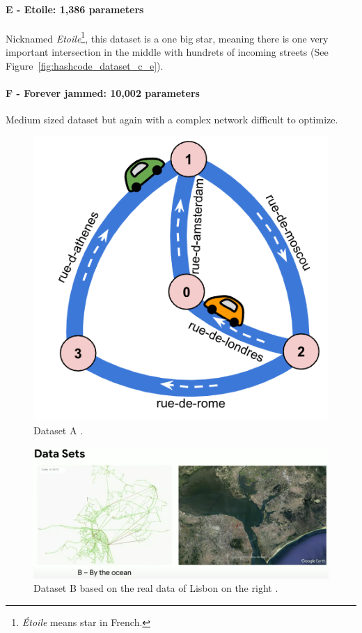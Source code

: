 \paragraph{E - Etoile: 1,386 parameters} Nicknamed \textit{Etoile}\footnote{\textit{Étoile} means star in French.}, this dataset is a one big star, meaning there is one very important intersection in the middle with hundrets of incoming streets (See Figure~\ref{fig:hashcode_dataset_c_e}).

\paragraph{F - Forever jammed: 10,002 parameters} Medium sized dataset but again with a complex network difficult to optimize.

\begin{figure}
    \centering
    \includegraphics[width=.6\linewidth]{img/hashcode/figure5.png}
    \caption[Dataset A]{
        Dataset A \cite{google2023google}.
    }
    \label{fig:hashcode_dataset_a}
\end{figure}

\begin{figure}
    \centering
    \includegraphics[width=\linewidth]{img/screenshots/hashcode_datasets_b.png}
    \caption[Dataset B]{
        Dataset B based on the real data of Lisbon on the right \cite{google2023google}.
    }
    \label{fig:hashcode_dataset_b}
\end{figure}


